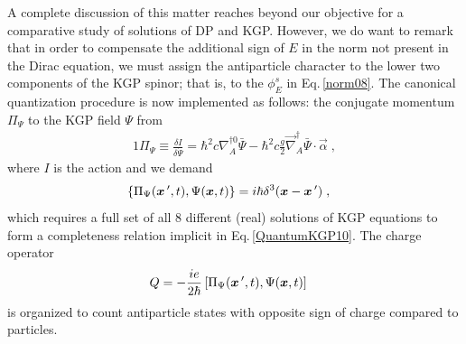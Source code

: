 \documentclass[epj]{svjour}
\begin{document}
A complete discussion of this matter reaches beyond our objective for a comparative study of solutions of DP and KGP. However, we do want to remark that in order to compensate the additional sign of $E$ in the norm not present in the Dirac equation, we must assign the antiparticle character to the lower two components of the KGP spinor; that is, to the $\phi_{E}^s$ in Eq.\,\eqref{norm08}. The canonical quantization procedure is now implemented as follows: the conjugate momentum $\Pi_\Psi$ to the KGP field $\Psi$ from
\begin{alignat}{1}
\label{QuantumKGP9}
\Pi_\Psi\equiv \frac{\delta I}{\delta \dot \Psi} =\hbar^2 c \nabla_{A}^{\dagger 0}\bar \Psi -\hbar^2 c\frac{g}{2}\vec{\nabla}_{A}^{\dagger}\bar\Psi\cdot\vec{\alpha}\;,
\end{alignat} 
where $I$ is the action and we demand
\begin{alignat}{1}
\label{QuantumKGP10} 
\left\{\Pi_\Psi(\vec x\,\rq,t),\Psi(\vec x,t)\right\}&=i\hbar\delta^3(\vec x-\vec x\,\rq)\;,
\end{alignat}
which requires a full set of all 8 different (real) solutions of KGP equations to form a completeness relation implicit in Eq.\,\eqref{QuantumKGP10}. The charge operator 
\begin{alignat}{1}
\label{QuantumKGP11} 
Q&=-\frac{ie}{2\hbar}\left[\Pi_\Psi(\vec x\,\rq,t),\Psi(\vec x,t)\right] 
\end{alignat}
is organized to count antiparticle states with opposite sign of charge compared to particles. 

\end{document}
